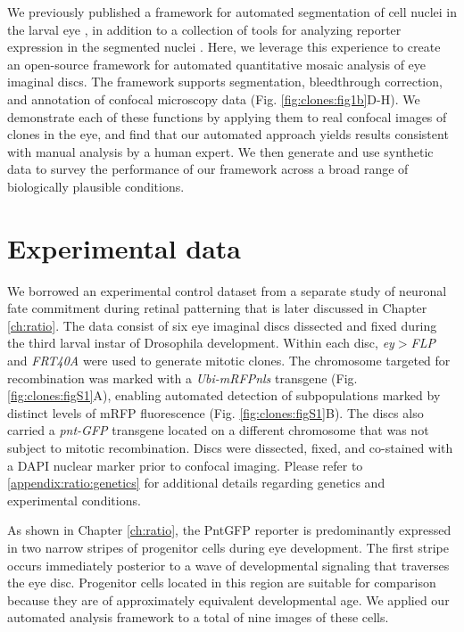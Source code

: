 We previously published a framework for automated segmentation of cell nuclei in the larval eye \cite{Pelaez2015a}, in addition to a collection of tools for analyzing reporter expression in the segmented nuclei \cite{Bernasek2018}. Here, we leverage this experience to create an open-source framework for automated quantitative mosaic analysis of eye imaginal discs. The framework supports segmentation, bleedthrough correction, and annotation of confocal microscopy data (Fig. \ref{fig:clones:fig1b}D-H). We demonstrate each of these functions by applying them to real confocal images of clones in the eye, and find that our automated approach yields results consistent with manual analysis by a human expert. We then generate and use synthetic data to survey the performance of our framework across a broad range of biologically plausible conditions.

\section{Experimental data}
\label{appendix:methods:clones:data}

We borrowed an experimental control dataset from a separate study of neuronal fate commitment during retinal patterning that is later discussed in Chapter \ref{ch:ratio}. The data consist of six eye imaginal discs dissected and fixed during the third larval instar of Drosophila development. Within each disc, \textit{ey$>$FLP} and \textit{FRT40A} were used to generate mitotic clones. The chromosome targeted for recombination was marked with a \textit{Ubi-mRFPnls} transgene (Fig. \ref{fig:clones:figS1}A), enabling automated detection of subpopulations marked by distinct levels of mRFP fluorescence (Fig. \ref{fig:clones:figS1}B). The discs also carried a \textit{pnt-GFP} transgene located on a different chromosome that was not subject to mitotic recombination. Discs were dissected, fixed, and co-stained with a DAPI nuclear marker prior to confocal imaging. Please refer to \ref{appendix:ratio:genetics} for additional details regarding genetics and experimental conditions.

As shown in Chapter \ref{ch:ratio}, the PntGFP reporter is predominantly expressed in two narrow stripes of progenitor cells during eye development. The first stripe occurs immediately posterior to a wave of developmental signaling that traverses the eye disc. Progenitor cells located in this region are suitable for comparison because they are of approximately equivalent developmental age. We applied our automated analysis framework to a total of nine images of these cells.

